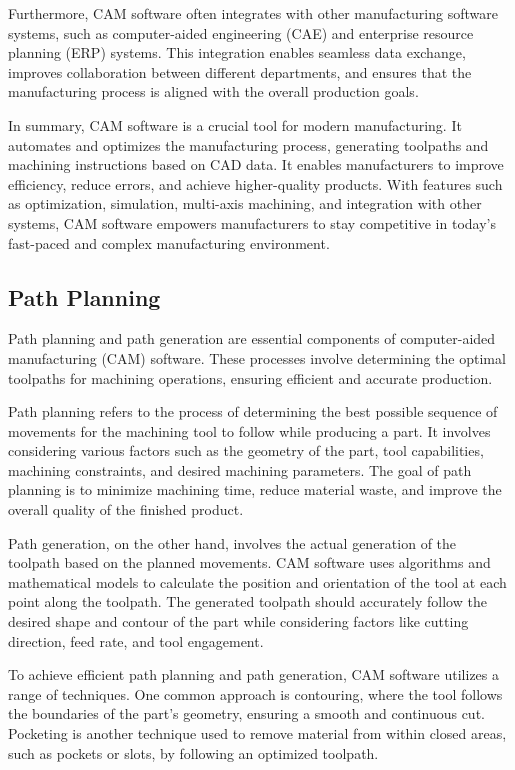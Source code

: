 Furthermore, CAM software often integrates with other manufacturing software systems, such as computer-aided engineering (CAE) and enterprise resource planning (ERP) systems. This integration enables seamless data exchange, improves collaboration between different departments, and ensures that the manufacturing process is aligned with the overall production goals.

In summary, CAM software is a crucial tool for modern manufacturing. It automates and optimizes the manufacturing process, generating toolpaths and machining instructions based on CAD data. It enables manufacturers to improve efficiency, reduce errors, and achieve higher-quality products. With features such as optimization, simulation, multi-axis machining, and integration with other systems, CAM software empowers manufacturers to stay competitive in today's fast-paced and complex manufacturing environment.
\subsection{Path Planning}
Path planning and path generation are essential components of computer-aided manufacturing (CAM) software. These processes involve determining the optimal toolpaths for machining operations, ensuring efficient and accurate production.

Path planning refers to the process of determining the best possible sequence of movements for the machining tool to follow while producing a part. It involves considering various factors such as the geometry of the part, tool capabilities, machining constraints, and desired machining parameters. The goal of path planning is to minimize machining time, reduce material waste, and improve the overall quality of the finished product.

Path generation, on the other hand, involves the actual generation of the toolpath based on the planned movements. CAM software uses algorithms and mathematical models to calculate the position and orientation of the tool at each point along the toolpath. The generated toolpath should accurately follow the desired shape and contour of the part while considering factors like cutting direction, feed rate, and tool engagement.

To achieve efficient path planning and path generation, CAM software utilizes a range of techniques. One common approach is contouring, where the tool follows the boundaries of the part's geometry, ensuring a smooth and continuous cut. Pocketing is another technique used to remove material from within closed areas, such as pockets or slots, by following an optimized toolpath.

